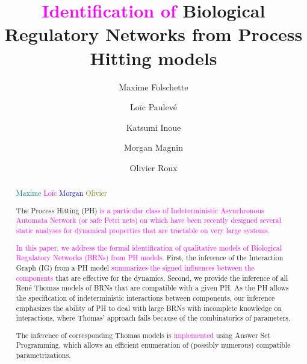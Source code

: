 \documentclass[preprint]{elsarticle}
\def\modMF#1{\textcolor{teal}{#1}}
\def\modLP#1{\textcolor{magenta}{#1}}
\def\modMM#1{\textcolor{blue}{#1}}
\def\modOR#1{\textcolor{olive}{#1}}
\begin{document}
\begin{frontmatter}

\title{\modLP{Identification of} Biological Regulatory Networks from Process Hitting models}

\author[irccyn,nii]{Maxime Folschette}
\author[lri]{Lo\"ic Paulev\'e}
\author[nii]{Katsumi Inoue}
\author[irccyn,nii]{Morgan Magnin}
\author[irccyn]{Olivier Roux}

\address[irccyn]{LUNAM Universit\'e, \'Ecole Centrale de Nantes, IRCCyN UMR CNRS 6597\\
(Institut de Recherche en Communications et Cybern\'etique de Nantes)\\
1 rue de la No\"e - B.P. 92101 - 44321 Nantes Cedex 3, France.}
\address[nii]{National Institute of Informatics,\\
2-1-2, Hitotsubashi, Chiyoda-ku, Tokyo 101-8430, Japan.}
\address[lri]{CNRS, Laboratoire de Recherche en Informatique UMR CNRS 8623\\
Universit\'e Paris-Sud, 91405 Orsay Cedex, France}


\begin{abstract}
\modMF{Maxime}
\modLP{Lo\"ic}
\modMM{Morgan}
\modOR{Olivier}

The Process Hitting (PH) \modLP{is a particular class of Indeterministic Asynchronous Automata
Network (or safe Petri nets) on which have been recently designed several static analyses for
dynamical properties that are tractable on very large systems.}

\modLP{In this paper, we address the formal identification of qualitative
models of Biological Regulatory Networks (BRNs) from PH models.}
First, the inference of the Interaction Graph (IG) from a PH model
\modLP{summarizes the signed influences between the components} that are effective for the dynamics.
Second, we provide the inference of all Ren\'e Thomas models of BRNs 
that are compatible with a given PH.
As the PH allows the specification of indeterministic interactions between
components, our inference emphasizes the ability of PH to deal with large BRNs with incomplete knowledge
on interactions, where Thomas' approach fails because of the combinatorics of parameters.

The inference of corresponding Thomas models is \modLP{implemented} using Answer Set Programming,
which allows an efficient enumeration of (possibly numerous) compatible parametrizations.


\end{abstract}
\end{frontmatter}
\end{document}
